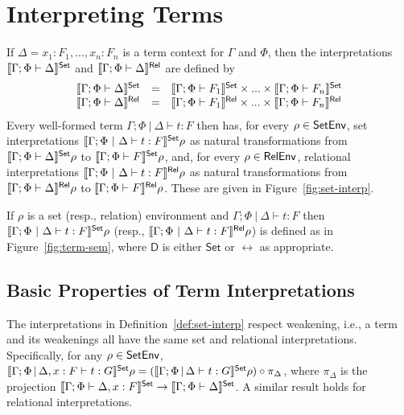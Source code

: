 \documentclass[runningheads]{llncs}
\newcommand{\set}{\mathsf{Set}}
\begin{document}
\section{Interpreting Terms}\label{sec:term-interp}

If $\Delta = x_1 : F_1,...,x_n : F_n$ is a term context for $\Gamma$
and $\Phi$, then the interpretations $\setsem{\Gamma;\Phi \vdash \Delta}$ and
$\llbracket{\Gamma;\Phi \vdash \Delta}\rrbracket^{\mathsf{Rel}}$ are defined by
\[\begin{array}{lll}
\setsem{\Gamma;\Phi \vdash \Delta} & = & \setsem{\Gamma;\Phi \vdash
  F_1} \times ... \times \setsem{\Gamma;\Phi \vdash F_n}\\ 
\relsem{\Gamma;\Phi \vdash \Delta} & = & \relsem{\Gamma;\Phi \vdash
  F_1} \times ... \times \relsem{\Gamma;\Phi \vdash F_n}\\ 
\end{array}\]
Every well-formed term $\Gamma;\Phi~|~\Delta \vdash t : F$ then
has, for every $\rho \in \mathsf{SetEnv}$, set interpretations
$\setsem{\Gamma;\Phi~|~\Delta \vdash t : F}\rho$ as natural
transformations from $\setsem{\Gamma; \Phi \vdash \Delta}\rho$ to
$\setsem{\Gamma; \Phi \vdash F}\rho$, and, for every $\rho \in
\mathsf{RelEnv}$, relational interpretations $\llbracket{\Gamma;\Phi~|~\Delta
  \vdash t : F}\rrbracket^{\mathsf{Rel}}\rho$ as natural transformations from
$\llbracket{\Gamma; \Phi \vdash \Delta}\rrbracket^{\mathsf{Rel}}\rho$ to $\llbracket{\Gamma; \Phi
  \vdash F}\rrbracket^{\mathsf{Rel}}\rho$. These are given in Figure~\ref{fig:set-interp}.

\begin{definition}\label{def:set-interp}
If $\rho$ is a set (resp., relation) environment and
$\Gamma;\Phi~|~\Delta \vdash t : F$ then
$\setsem{\Gamma;\Phi~|~\Delta \vdash t : F}\rho$ (resp.,
$\llbracket{\Gamma;\Phi~|~\Delta \vdash t : F}\rrbracket^{\mathsf{Rel}}\rho$) is defined as in
Figure~\ref{fig:term-sem}, where $\mathsf D$ is either $\set$ or
$\rel$ as appropriate.
\end{definition}

\subsection{Basic Properties of Term Interpretations}

The interpretations in Definition~\ref{def:set-interp} respect
weakening, i.e., a term and its weakenings all have the same set and
relational interpretations. Specifically, for any $\rho \in \mathsf{SetEnv}$,
$\setsem{\Gamma;\Phi \,|\, \Delta, x : F \vdash t : G}\rho =
(\setsem{\Gamma;\Phi \,|\, \Delta \vdash t : G}\rho) \circ
\pi_{\Delta}$, where $\pi_{\Delta}$ is the projection
$\setsem{\Gamma;\Phi \vdash \Delta, x : F} \to
\setsem{\Gamma;\Phi \vdash \Delta}$. A similar result holds for
relational interpretations.
\end{document}

